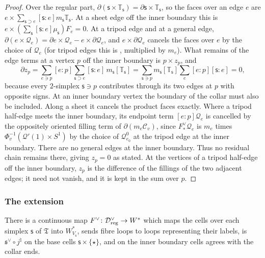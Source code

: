 \begin{proof}
Over the regular part, $\partial(\mathsf s\times\mathbb T_{\mathsf s})=\partial \mathsf s\times\mathbb T_{\mathsf s}$, so the faces over an edge $e$ are
$e\times\sum_{\mathsf s\supset e}[\mathsf s:e]m_{\mathsf s}\mathbb T_{\mathsf s}$. At a sheet edge off the inner boundary this is
$e\times(\sum_{\mathsf s}[\mathsf s:e]\mu_{\mathsf s})F_e=0$. At a tripod edge and
at a general edge, $\partial(e\times \mathscr Q_e)=\partial e\times \mathscr Q_e-e\times\partial \mathscr Q_e$, and $e\times\partial \mathscr Q_e$ cancels the faces
over $e$ by the choice of $\mathscr Q_e$ (for tripod edges this is \cite[\S7.7, Step~2]{CBM}, multiplied by $m_e$). What remains
of the edge terms at a vertex $p$ off the inner boundary is $p\times z_p$, and
\[
\partial z_p=\sum_{e\ni p}[e:p]\sum_{\mathsf s\supset e}[\mathsf s:e]\,m_{\mathsf s}[\mathbb T_{\mathsf s}]=\sum_{\mathsf s\ni p}m_{\mathsf s}[\mathbb T_{\mathsf s}]\sum_{e}[e:p][\mathsf s:e]=0,
\]
because every $2$-simplex $\mathsf s\ni p$ contributes through its two edges at $p$ with opposite signs.
At an inner boundary vertex the boundary of the collar must also be included. Along a sheet it cancels the product
faces exactly. Where a tripod half-edge meets the inner boundary, its endpoint term $[e:p]\mathscr Q_e$ is cancelled by the
oppositely oriented filling term of $\partial(m_e\mathscr C_v)$, since $F^\vee_*\mathscr Q_e$ is $m_e$ times
$\Phi_v^{-1}(\mathcal Q'(1)\times S^1)$ by the choice of $\mathscr Q^0_{e_0}$ at the tripod edge at the inner boundary. There are no general edges at the inner boundary. Thus no residual chain remains there,
giving $z_p=0$ as stated. At the vertices of a tripod half-edge off the inner boundary, $z_p$ is the difference of the
fillings of the two adjacent edges; it need not vanish, and it is kept in the sum over $p$.
\end{proof}

\subsubsection*{The extension}
\begin{lemma}[extension]\label{lem:extB}
There is a continuous map $F^\vee\colon\mathcal D^\vee_{\rm reg}\to W^*$ which maps the cells over each simplex $\mathsf s$ of
$\mathfrak T$ into $W^*_{V_{\mathsf s}}$, sends fibre loops to loops representing their labels, is $\mathfrak s^\vee\circ j^\natural$ on the
base cells $\mathsf s\times\{\star\}$, and on the inner boundary cells agrees with the collar ends.
\end{lemma}

